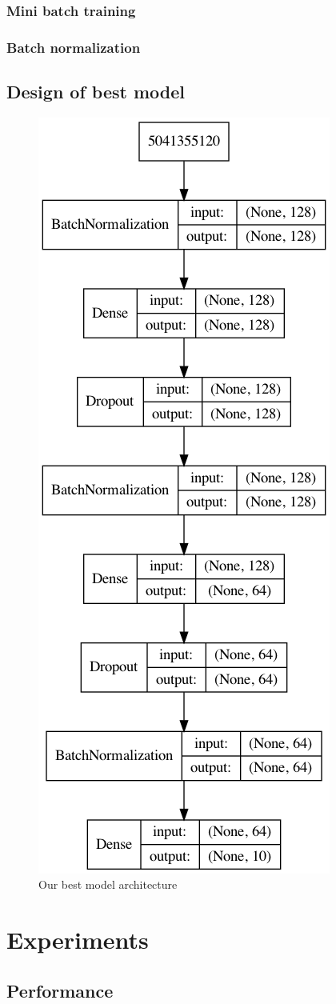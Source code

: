 \documentclass{article}
\begin{document}
\subsubsection{Mini batch training}
\subsubsection{Batch normalization}
\subsection{Design of best model}
\begin{figure}
\includegraphics[width=0.5\linewidth]{../model}
\caption{Our best model architecture \label{fig:model}}
\end{figure}

\section{Experiments}
\subsection{Performance}
\end{document}

